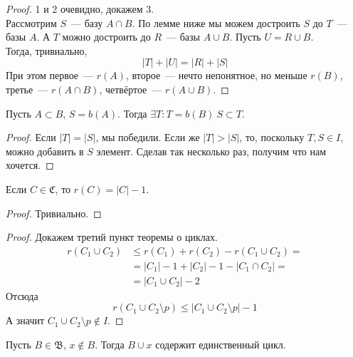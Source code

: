 \documentclass{article}
\begin{document}
    \begin{proof}
        1 и 2 очевидно, докажем 3.\\
        Рассмотрим $S$~--- базу $A\cap B$. По лемме ниже мы можем достроить $S$ до $T$~--- базы $A$. А $T$ можно достроить до $R$~--- базы $A\cup B$. Пусть $U=R\cup B$.\\
        Тогда, тривиально,
        $$|T|+|U|=|R|+|S|$$
        При этом первое~--- $r(A)$, второе~--- нечто непонятное, но меньше $r(B)$, третье~--- $r(A\cap B)$, четвёртое~--- $r(A\cup B)$.
    \end{proof}
    \begin{lemma}
        Пусть $A\subset B$, $S=b(A)$. Тогда $\exists T:T=b(B)~S\subset T$.
    \end{lemma}
    \begin{proof}
        Если $|T|=|S|$, мы победили. Если же $|T|>|S|$, то, поскольку $T,S\in I$, можно добавить в $S$ элемент. Сделав так несколько раз, получим что нам хочется.
    \end{proof}
    \begin{lemma}
        Если $C\in\mathfrak C$,  то $r(C)=|C|-1$.
    \end{lemma}
    \begin{proof}
        Тривиально.
    \end{proof}
    \begin{proof}
        Докажем третий пункт теоремы о циклах.\\
        \[\begin{split}
            r(C_1\cup C_2)&\leqslant r(C_1)+r(C_2)-r(C_1\cup C_2)=\\
            &=|C_1|-1+|C_2|-1-|C_1\cap C_2|=\\
            &=|C_1\cup C_2|-2
        \end{split}\]
        Отсюда
        $$
        r(C_1\cup C_2\setminus p)\leqslant|C_1\cup C_2\setminus p|-1
        $$
        А значит $C_1\cup C_2\setminus p\notin I$.
    \end{proof}
    \begin{lemma}
        Пусть $B\in\mathfrak B$, $x\notin B$. Тогда $B\cup x$ содержит единственный цикл.
    \end{lemma}
\end{document}

